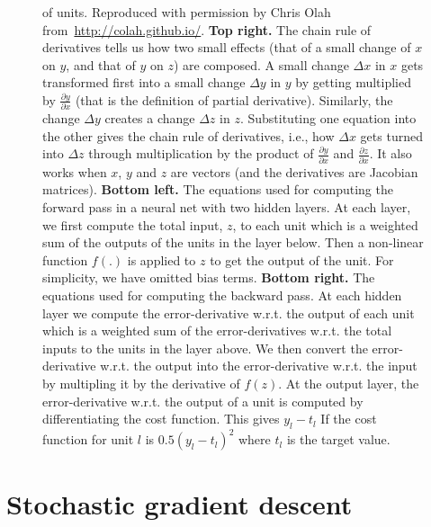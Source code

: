 \documentclass[10pts]{article}
\begin{document}
\begin{figure}[htp]
{\begin{minipage}{\textwidth}
{of units. Reproduced with permission by Chris Olah from~\url{http://colah.github.io/}.
\newline
{\bf Top right.} The chain rule of derivatives tells us how
two small effects (that of a small change of $x$ on $y$, and that of $y$ on $z$)
are composed. A small change $\Delta x$ in $x$
gets transformed first into a small change $\Delta y$ in $y$
by getting multiplied by $\frac{\partial y}{\partial x}$
(that is the definition of partial derivative). Similarly,
the change $\Delta y$ creates a change $\Delta z$ in $z$. Substituting one equation
into the other gives the chain rule of derivatives, i.e., how
$\Delta x$ gets turned into $\Delta z$ through multiplication
by the product of $\frac{\partial y}{\partial x}$ and
$\frac{\partial z}{\partial x}$. It also works when $x$, $y$
and $z$ are vectors (and the derivatives are Jacobian matrices). \newline
{\bf Bottom left.} The equations used for computing the forward pass in a neural net
with two hidden layers. At each layer, we first compute the total input,
$z$, to each unit which is a weighted sum of the outputs of the units in
the layer below. Then a non-linear function $f(.)$ is applied to $z$ to get
the output of the unit.  For simplicity, we have omitted bias terms. \newline
{\bf Bottom right.} The equations used for computing the backward pass. At each hidden
layer we compute the error-derivative w.r.t. the output of each unit which
is a weighted sum of the error-derivatives w.r.t. the total inputs to the
units in the layer above. We then convert the error-derivative w.r.t. the
output into the error-derivative w.r.t. the input by multipling it by the
derivative of $f(z)$.  At the output layer, the error-derivative w.r.t. the
output of a unit is computed by differentiating the cost function. This
gives $y_l-t_l$ If the cost function for unit $l$ is $0.5(y_l-t_l)^2$ where
$t_l$ is the target value.
}
\label{fig:backprop-box}
\end{minipage}
}
\end{figure}


\section{Stochastic gradient descent}
\end{document}
